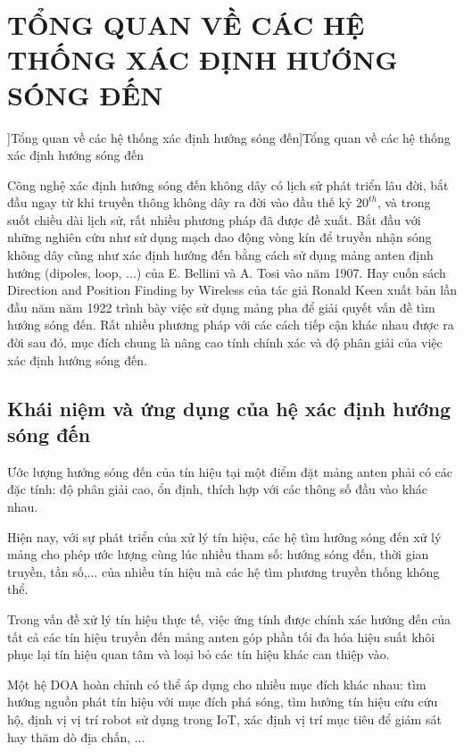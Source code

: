 \clearpage
{}

\setcounter{chapter}{0}
\chapter[{TỔNG QUAN VỀ CÁC HỆ THỐNG XÁC ĐỊNH HƯỚNG SÓNG ĐẾN}]{TỔNG QUAN VỀ CÁC HỆ THỐNG XÁC ĐỊNH HƯỚNG SÓNG ĐẾN}]{Tổng quan về các hệ thống xác định hướng sóng đến}]{Tổng quan về các hệ thống xác định hướng sóng đến}

Công nghệ xác định hướng sóng đến không dây có lịch sử phát triển lâu đời, bắt đầu ngay từ khi truyền thông không dây ra đời vào đầu thế kỷ $20^{th}$, và trong suốt chiều dài lịch sử, rất nhiều phương pháp đã được đề xuất. Bắt đầu với những nghiên cứu như sử dụng mạch dao động vòng kín để truyền nhận sóng không dây cũng như xác định hướng đến bằng cách sử dụng mảng anten định hướng (dipoles, loop, ...) của  E. Bellini  và  A. Tosi \cite{Bellini1907} vào năm 1907. Hay cuốn sách Direction and Position Finding by Wireless \cite{Darwin1895} của tác giả Ronald Keen xuất bản lần đầu năm năm 1922 trình bày việc sử dụng mảng pha để giải quyết vấn đề tìm hướng sóng đến. Rất nhiều phương pháp với các cách tiếp cận khác nhau được ra đời sau đó, mục đích chung là nâng cao tính chính xác và độ phân giải của việc xác định hướng sóng đến.

\section{Khái niệm và ứng dụng của hệ xác định hướng sóng đến}

Ước lượng hướng sóng đến của tín hiệu tại một điểm đặt mảng anten phải có các đặc tính: độ phân giải cao, ổn định, thích hợp với các thông số đầu vào khác nhau.

Hiện nay, với sự phát triển của xử lý tín hiệu, các hệ tìm hướng sóng đến xử lý mảng cho phép ước lượng cùng lúc nhiều tham số: hướng sóng đến, thời gian truyền, tần số,... của nhiều tín hiệu mà các hệ tìm phương truyền thống không thể.

Trong vấn đề xử lý tín hiệu thực tế, việc ứng tính được chính xác hướng đến của tất cả các tín hiệu truyền đến mảng anten góp phần tối đa hóa hiệu suất khôi phục lại tín hiệu quan tâm và loại bỏ các tín hiệu khác can thiệp vào.

Một hệ DOA hoàn chỉnh có thể áp dụng cho nhiều mục đích khác nhau: tìm hướng nguồn phát tín hiệu với mục đích phá sóng, tìm hướng tín hiệu cứu cứu hộ, định vị vị trí robot sử dụng trong IoT, xác định vị trí mục tiêu để giám sát hay thăm dò địa chấn, ...
\newpage
